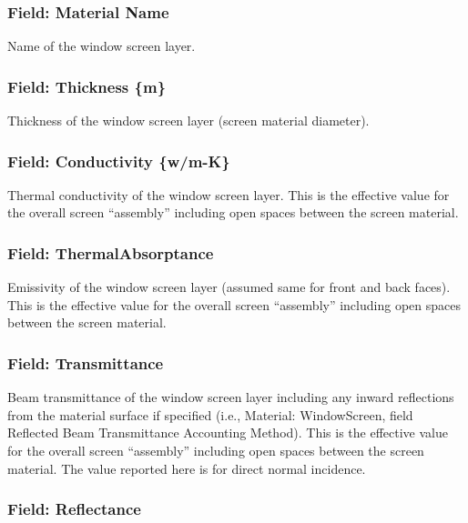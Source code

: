 \subsubsection{Field: Material Name}\label{field-material-name-6}

Name of the window screen layer.

\subsubsection{Field: Thickness \{m\}}\label{field-thickness-m-3}

Thickness of the window screen layer (screen material diameter).

\subsubsection{Field: Conductivity \{w/m-K\}}\label{field-conductivity-wm-k-2}

Thermal conductivity of the window screen layer. This is the effective value for the overall screen ``assembly'' including open spaces between the screen material.

\subsubsection{Field: ThermalAbsorptance}\label{field-thermalabsorptance-1}

Emissivity of the window screen layer (assumed same for front and back faces). This is the effective value for the overall screen ``assembly'' including open spaces between the screen material.

\subsubsection{Field: Transmittance}\label{field-transmittance}

Beam transmittance of the window screen layer including any inward reflections from the material surface if specified (i.e., Material: WindowScreen, field Reflected Beam Transmittance Accounting Method). This is the effective value for the overall screen ``assembly'' including open spaces between the screen material. The value reported here is for direct normal incidence.

\subsubsection{Field: Reflectance}\label{field-reflectance}

